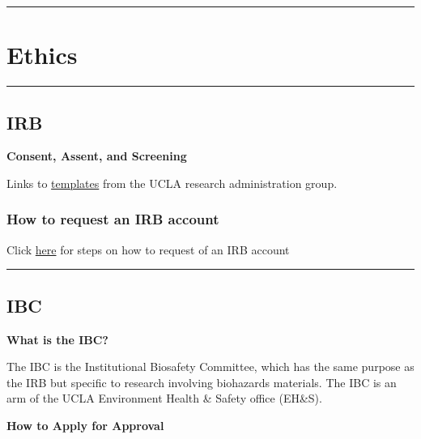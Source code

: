 \documentclass[
]{book}
\begin{document}
\begin{center}\rule{0.5\linewidth}{0.5pt}\end{center}

\hypertarget{ethics}{%
\section{Ethics}\label{ethics}}

\begin{center}\rule{0.5\linewidth}{0.5pt}\end{center}

\hypertarget{irb}{%
\subsection{IRB}\label{irb}}

\textbf{Consent, Assent, and Screening}

Links to \href{https://ohrpp.research.ucla.edu/consent-templates/}{templates} from the UCLA research administration group.

\hypertarget{how-to-request-an-irb-account}{%
\subsubsection{How to request an IRB account}\label{how-to-request-an-irb-account}}

Click \href{https://webirb.research.ucla.edu/WEBIRB/Rooms/DisplayPages/LayoutInitial?Container=com.webridge.entity.Entity\%5BOID\%5B8990716E5E076B40BFE2D4D479617FD3\%5D\%5D}{here} for steps on how to request of an IRB account

\begin{center}\rule{0.5\linewidth}{0.5pt}\end{center}

\hypertarget{ibc}{%
\subsection{IBC}\label{ibc}}

\textbf{What is the IBC?}

The IBC is the Institutional Biosafety Committee, which has the same purpose as the IRB but specific to research involving biohazards materials. The IBC is an arm of the UCLA Environment Health \& Safety office (EH\&S).

\textbf{How to Apply for Approval}
\end{document}
